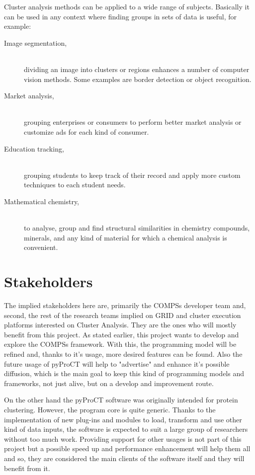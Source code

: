 Cluster analysis methods can be applied to a wide range of subjects. Basically it can be used in any context where finding groups in sets of data is useful, for example:

\begin{description}
\item [Image segmentation,] \hfill \\ dividing an image into clusters or regions enhances a number of computer vision methods. Some examples are border detection or object recognition. \cite{Ayech2015}
\item [Market analysis,] \hfill \\ grouping enterprises \cite{Burca2014} or consumers \cite{Muller2014} to perform better market analysis or customize ads for each kind of consumer.
\item [Education tracking,] \hfill \\ grouping students to keep track of their record and apply more custom techniques to each student needs. \cite{Chan2014}
\item [Mathematical chemistry,] \hfill \\ to analyse, group and find structural similarities in chemistry compounds, minerals, and any kind of material for which a chemical analysis is convenient. \cite{Cortes2007}
\end{description}


\section{Stakeholders}

The implied stakeholders here are, primarily the COMPSs developer team and, second, the rest of the research teams implied on GRID and cluster execution platforms interested on Cluster Analysis. They are the ones who will mostly benefit from this project. As stated earlier, this project wants to develop and explore the COMPSs framework. With this, the programming model will be refined and, thanks to it's usage, more desired features can be found. Also the future usage of pyProCT will help to "advertise" and enhance it's possible diffusion, which is the main goal to keep this kind of programming models and frameworks, not just alive, but on a develop and improvement route.

On the other hand the pyProCT software was originally intended for protein clustering. However, the program core is quite generic. Thanks to the implementation of new plug-ins and modules to load, transform and use other kind of data inputs, the software is expected to suit a large group of researchers without too much work. Providing support for other usages is not part of this project but a possible speed up and performance enhancement will help them all and so, they are considered the main clients of the software itself and they will benefit from it.

